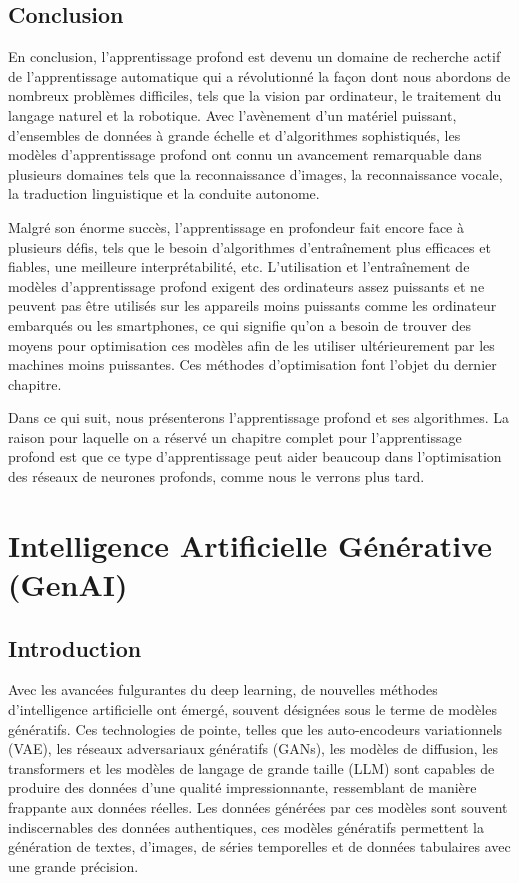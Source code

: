 \section{Conclusion}
En conclusion, l'apprentissage profond est devenu un domaine de recherche actif
de l'apprentissage automatique qui a révolutionné la façon dont nous abordons
de nombreux problèmes difficiles, tels que la vision par ordinateur, le
traitement du langage naturel et la robotique. Avec l'avènement d'un matériel
puissant, d'ensembles de données à grande échelle et d'algorithmes
sophistiqués, les modèles d'apprentissage profond ont connu un avancement
remarquable dans plusieurs domaines tels que la reconnaissance d'images, la
reconnaissance vocale, la traduction linguistique et la conduite autonome.

\medskip
Malgré son énorme succès, l'apprentissage en profondeur fait encore face à plusieurs défis, tels que le besoin d'algorithmes d'entraînement plus efficaces et fiables, une meilleure interprétabilité, etc. L’utilisation et l'entraînement de modèles d’apprentissage profond exigent des ordinateurs assez puissants et ne peuvent pas être utilisés sur les appareils moins puissants comme les ordinateur embarqués ou les smartphones, ce qui signifie qu'on a besoin de trouver des moyens pour optimisation ces modèles afin de les utiliser ultérieurement par les machines moins puissantes. Ces méthodes d'optimisation font l'objet du dernier chapitre.

\medskip
Dans ce qui suit, nous présenterons l'apprentissage profond et ses algorithmes. La raison pour laquelle on a réservé un chapitre complet pour l'apprentissage profond est que ce type d'apprentissage peut aider beaucoup dans l'optimisation des réseaux de neurones profonds, comme nous le verrons plus tard.

\clearpage


\chapter{Intelligence Artificielle Générative (GenAI)}
\section{Introduction}

Avec les avancées fulgurantes du deep learning, de nouvelles méthodes
d'intelligence artificielle ont émergé, souvent désignées sous le terme de
modèles génératifs. Ces technologies de pointe, telles que les auto-encodeurs
variationnels (VAE), les réseaux adversariaux génératifs (GANs), les modèles de
diffusion, les transformers et les modèles de langage de grande taille (LLM)
sont capables de produire des données d'une qualité impressionnante,
ressemblant de manière frappante aux données réelles. Les données générées par
ces modèles sont souvent indiscernables des données authentiques, ces modèles
génératifs permettent la génération de textes, d'images, de séries temporelles
et de données tabulaires avec une grande précision.

